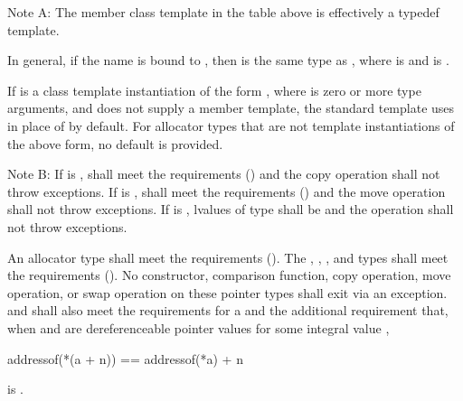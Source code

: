 \pnum
Note A: The member class template  in the table above is
effectively a typedef template.
\begin{note}
In general, if
the name  is bound to , then
 is the same type as
, where
 is  and
 is .
\end{note}
If
 is a class template instantiation of the form
, where  is zero or more type
arguments, and  does not supply a  member
template, the standard  template uses
 in place of 
by default. For allocator types that are not template instantiations of the
above form, no default is provided.

\pnum
Note B:
If  is ,
 shall meet the
 requirements ()
and the copy operation shall not throw exceptions.
If  is ,
 shall meet the
 requirements ()
and the move operation shall not throw exceptions.
If  is ,
lvalues of type  shall be 
and the  operation shall not throw exceptions.

\pnum
An allocator type  shall meet the
 requirements ().
The , , , and
 types shall meet the
 requirements ().
No constructor,
comparison function, copy operation, move operation, or swap operation on
these pointer types shall exit via an exception.  and  shall also
meet the requirements for
a  and
the additional requirement that, when  and  are
dereferenceable pointer values for some integral value ,
\begin{codeblock}
addressof(*(a + n)) == addressof(*a) + n
\end{codeblock}
is .

